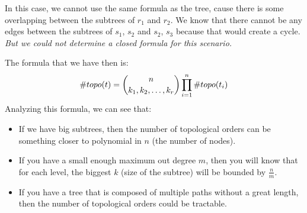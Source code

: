 \begin{figure}[ht]
\centering 
\end{figure}


In this case, we cannot use the same formula as the tree, cause there is some overlapping between the subtrees of $r_1$ and $r_2$. We know that there cannot be any edges between the subtrees of $s_1$, $s_2$ and $s_2$, $s_3$ because that would create a cycle. \emph{But we could not determine a closed formula for this scenario. }

The formula that we have then is: $$\#topo(t) =  \binom{n}{k_1, k_2, \ldots, k_r} \prod_{i=1}^{n} \#topo(t_i)$$
Analyzing this formula, we can see that:

\begin{itemize}
    \item If we have big subtrees, then the number of topological orders can be something closer to polynomial in $n$ (the number of nodes). 
    \item If you have a small enough maximum out degree $m$, then you will know that for each level, the biggest $k$ (size of the subtree) will be bounded by $\frac{n}{m}$.
    \item  If you have a tree that is composed of multiple paths without a great length, then the number of topological orders could be tractable. 
\end{itemize}

